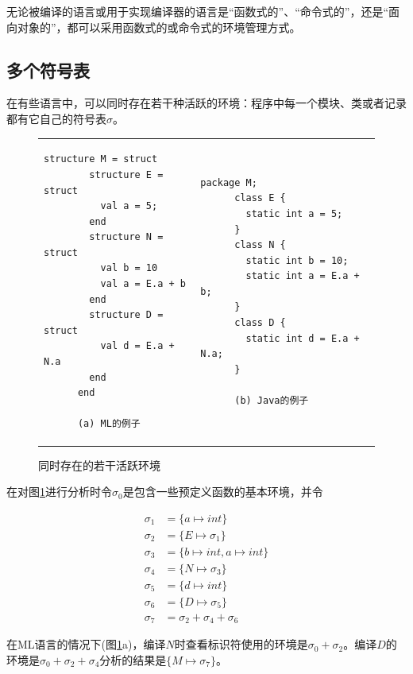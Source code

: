 \documentclass[cn,11pt,chinese]{elegantbook}
\begin{document}
无论被编译的语言或用于实现编译器的语言是“函数式的”、“命令式的”，还是“面向对象的”，都可以采用函数式的或命令式的环境管理方式。

\subsection{多个符号表}

在有些语言中，可以同时存在若干种活跃的环境：程序中每一个模块、类或者记录都有它自己的符号表$\sigma$。

\begin{figure}[htbp]
  \centering
  \begin{tabular}{p{6cm}p{6cm}}
    \begin{lstlisting}[frame=none]
      structure M = struct
        structure E = struct
          val a = 5;
        end
        structure N = struct
          val b = 10
          val a = E.a + b
        end
        structure D = struct
          val d = E.a + N.a
        end
      end

      (a) ML的例子
    \end{lstlisting}
    &
    \begin{lstlisting}[frame=none]
      package M;
      class E {
        static int a = 5;
      }
      class N {
        static int b = 10;
        static int a = E.a + b;
      }
      class D {
        static int d = E.a + N.a;
      }

      (b) Java的例子
    \end{lstlisting}
  \end{tabular}
  \caption{同时存在的若干活跃环境}
  \label{fig:5-1}
\end{figure}

在对图\ref{fig:5-1}进行分析时令$\sigma_0$是包含一些预定义函数的基本环境，并令

\begin{align*}
  \sigma_1 &= \{a\mapsto int\} \\
  \sigma_2 &= \{E\mapsto \sigma_1\} \\
  \sigma_3 &= \{b\mapsto int,a\mapsto int\} \\
  \sigma_4 &= \{N\mapsto \sigma_3\} \\
  \sigma_5 &= \{d\mapsto int\} \\
  \sigma_6 &= \{D\mapsto \sigma_5\} \\
  \sigma_7 &= \sigma_2 + \sigma_4 + \sigma_6
\end{align*}

在ML语言的情况下(图\ref{fig:5-1}a)，编译$N$时查看标识符使用的环境是$\sigma_0+\sigma_2$。编译$D$的环境是$\sigma_0+\sigma_2+\sigma_4$分析的结果是$\{M\mapsto\sigma_7\}$。
\end{document}
